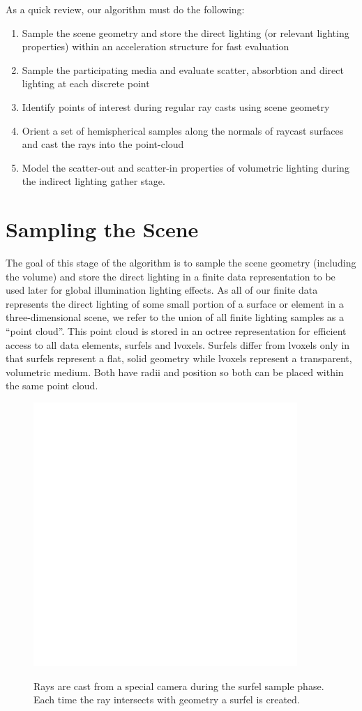 \documentclass[12pt]{ucthesis}
\newcommand{\captionfonts}{\small\bf\ssp}
\begin{document}
As a quick review, our algorithm must do the following:
\begin{enumerate}
\item Sample the scene geometry and store the direct lighting (or relevant lighting properties) within an acceleration structure for fast evaluation
\item Sample the participating media and evaluate scatter, absorbtion and direct lighting at each discrete point
\item Identify points of interest during regular ray casts using scene geometry 
\item Orient a set of hemispherical samples along the normals of raycast surfaces and cast the rays into the point-cloud
\item Model the scatter-out and scatter-in properties of volumetric lighting during the indirect lighting gather stage.
\end{enumerate}

\section{Sampling the Scene}
The goal of this stage of the algorithm is to sample the scene geometry (including the volume) and store the direct lighting in a finite data representation to be used later for global illumination lighting effects.  As all of our finite data represents the direct lighting of some small portion of a surface or element in a three-dimensional scene, we refer to the union of all finite lighting samples as a ``point cloud''.  This point cloud is stored in an octree representation for efficient access to all data elements, surfels and lvoxels.  Surfels differ from lvoxels only in that surfels represent a flat, solid geometry while lvoxels represent a transparent, volumetric medium.  Both have radii and position so both can be placed within the same point cloud.  

\begin{figure}[h!]
    \centering
    \includegraphics[width=100mm]{img/diag/surfel_samp.pdf}
    \captionfonts
    \caption{Rays are cast from a special camera during the surfel sample phase.  Each time the ray intersects with geometry a surfel is created.}
    \label{fig:surf_sample}
\end{figure}
\end{document}
